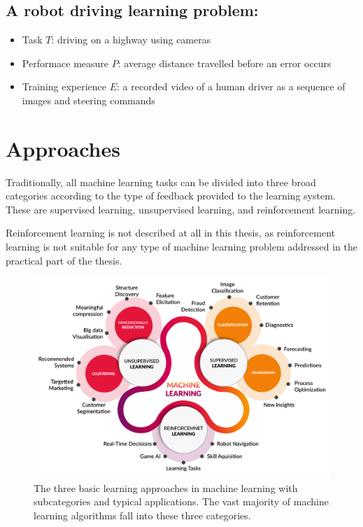 \subsection*{A robot driving learning problem:}

\begin{itemize}
    \item Task $T$: driving on a highway using cameras
    \item Performace measure $P$: average distance travelled before an error occurs
    \item Training experience $E$: a recorded video of a human driver as a sequence of images and steering commands
\end{itemize}

\section{Approaches}

Traditionally, all machine learning tasks can be divided into three broad categories according to the type of feedback provided to the learning system. These are supervised learning, unsupervised learning, and reinforcement learning\cite{ml-types1,ml-types2}.

Reinforcement learning is not described at all in this thesis, as reinforcement learning is not suitable for any type of machine learning problem addressed in the practical part of the thesis.

\begin{figure}[ht]
    \centering
    \includegraphics[width=1\linewidth]{media/machine-learning-approaches.png}
    \caption{The three basic learning approaches in machine learning with subcategories and typical applications. The vast majority of machine learning algorithms fall into these three categories.\cite{machine-learning-approaches}}
    \label{fig:machine-learning-approaches}
\end{figure}

